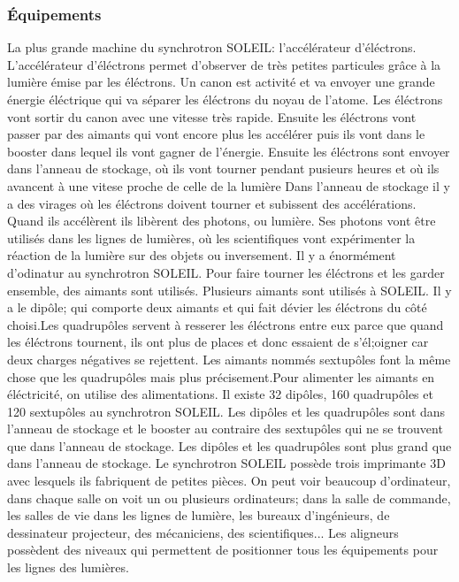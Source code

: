 		\subsubsection{Équipements}
				La plus grande machine du synchrotron SOLEIL: l'accélérateur d'éléctrons.
				L'accélérateur d'éléctrons permet d'observer de très petites particules grâce à la lumière émise par les éléctrons.
				Un canon est activité et va envoyer une grande énergie éléctrique qui va séparer les éléctrons du noyau de l'atome. Les éléctrons vont sortir du canon avec une vitesse très rapide. Ensuite les éléctrons vont passer par des aimants qui vont encore plus les accélérer puis ils vont dans le booster dans lequel ils vont gagner de l'énergie. Ensuite les éléctrons sont envoyer dans l'anneau de stockage, où ils vont tourner pendant pusieurs heures et où ils avancent à une vitese proche de celle de la lumière Dans l'anneau de stockage il y a des virages où les éléctrons doivent tourner et subissent des accélérations. Quand ils accélèrent ils libèrent des photons, ou lumière. Ses photons vont être utilisés dans les lignes de lumières, où les scientifiques vont expérimenter la réaction de la lumière sur des objets ou inversement.
				Il y a énormément d'odinatur au synchrotron SOLEIL.
				Pour faire tourner les éléctrons et les garder ensemble, des aimants sont utilisés. Plusieurs aimants sont utilisés à SOLEIL. Il y a le dipôle; qui comporte deux aimants et qui fait dévier les éléctrons du côté choisi.Les quadrupôles servent à resserer les éléctrons entre eux parce que quand les éléctrons tournent, ils ont plus de places et donc essaient de s'él;oigner car deux charges négatives se rejettent. Les aimants nommés sextupôles font la même chose que les quadrupôles mais plus précisement.Pour alimenter les aimants en éléctricité, on utilise des alimentations. Il existe 32 dipôles, 160 quadrupôles et 120 sextupôles au synchrotron SOLEIL. Les dipôles et les quadrupôles sont dans l'anneau de stockage et le booster au contraire des sextupôles qui ne se trouvent que dans l'anneau de stockage. Les dipôles et les quadrupôles sont plus grand que dans l'anneau de stockage.
				Le synchrotron SOLEIL possède trois imprimante 3D avec lesquels ils fabriquent de petites pièces. On peut voir beaucoup d'ordinateur, dans chaque salle on voit un ou plusieurs ordinateurs; dans la salle de commande, les salles de vie dans les lignes de lumière, les bureaux d'ingénieurs, de dessinateur projecteur, des mécaniciens, des scientifiques... Les aligneurs possèdent des niveaux qui permettent de positionner tous les équipements pour les lignes des lumières. 



